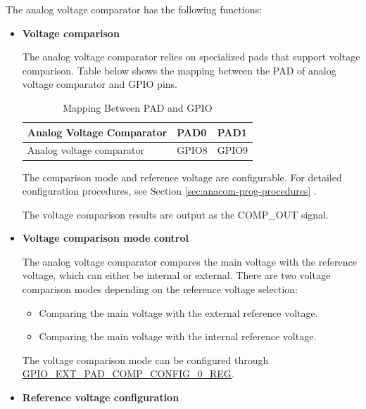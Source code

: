 \documentclass[main\_\_EN.tex]{subfiles}
\begin{document}
The analog voltage comparator has the following functions:

\begin{itemize}

    \item {\bfseries Voltage comparison}

          The analog voltage comparator relies on specialized pads that support voltage comparison. Table below shows the mapping between the PAD of analog voltage comparator and GPIO pins.

          \begin{longtable}{ | L{5.5cm} | L{2cm} | L{2cm} | }
          \caption{Mapping Between PAD and GPIO} \label{tab:anacom-pad-gpio-mapping}\\ \hline
          \textbf{Analog Voltage Comparator} & \textbf{PAD0}  &  \textbf{PAD1}\\ \hline
          Analog voltage comparator & GPIO8  &  GPIO9  \\ \hline
          \end{longtable}

          The comparison mode and reference voltage are configurable. For detailed configuration procedures, see Section \ref{sec:anacom-prog-procedures} .

          The voltage comparison results are output as the COMP\_OUT signal.

    \item {\bfseries Voltage comparison mode control}

          The analog voltage comparator compares the main voltage with the reference voltage, which can either be internal or external. There are two voltage comparison modes depending on the reference voltage selection:

          \begin{itemize}
            \item Comparing the main voltage with the external reference voltage.
            \item Comparing the main voltage with the internal reference voltage.
          \end{itemize}

          The voltage comparison mode can be configured through \hyperref[regdesc:GPIOEXTPADCOMPCONFIG0REG]{GPIO\_EXT\_PAD\_COMP\_CONFIG\_0\_REG}.

    \item {\bfseries Reference voltage configuration}


\end{itemize}
\end{document}
